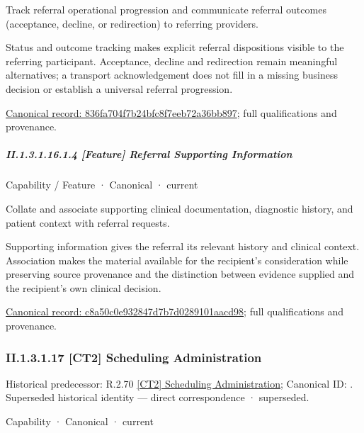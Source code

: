 Track referral operational progression and communicate referral outcomes (acceptance, decline, or redirection) to referring providers.



Status and outcome tracking makes explicit referral dispositions visible to the referring participant. Acceptance, decline and redirection remain meaningful alternatives; a transport acknowledgement does not fill in a missing business decision or establish a universal referral progression.


{\footnotesize \href{../../../../continuum/strategy/capability/feature/836fa704f7b24bfc8f7eeb72a36bb897.md}{Canonical record: 836fa704f7b24bfc8f7eeb72a36bb897}; full qualifications and provenance.}\par
\subparagraph*{II.1.3.1.16.1.4 [Feature] Referral Supporting Information}
\label{navigation:II.1.3.1.16.1.4}

\label{element:c8a50c0e932847d7b7d0289101aacd98}
{\small Capability / Feature · Canonical · current}\par

Collate and associate supporting clinical documentation, diagnostic history, and patient context with referral requests.



Supporting information gives the referral its relevant history and clinical context. Association makes the material available for the recipient's consideration while preserving source provenance and the distinction between evidence supplied and the recipient's own clinical decision.


{\footnotesize \href{../../../../continuum/strategy/capability/feature/c8a50c0e932847d7b7d0289101aacd98.md}{Canonical record: c8a50c0e932847d7b7d0289101aacd98}; full qualifications and provenance.}\par
\subsubsection*{II.1.3.1.17 [CT2] Scheduling Administration}
\label{navigation:II.1.3.1.17}

{\small Historical predecessor: R.2.70 \hyperref[element:1a6630940ffb44fcad4543b93a367b67]{[CT2] Scheduling Administration}; Canonical ID: \texttt{}. Superseded historical identity — direct correspondence · superseded.}\par
\label{element:35fb3744c900470f9895056246a13fb1}
{\small Capability · Canonical · current}\par

